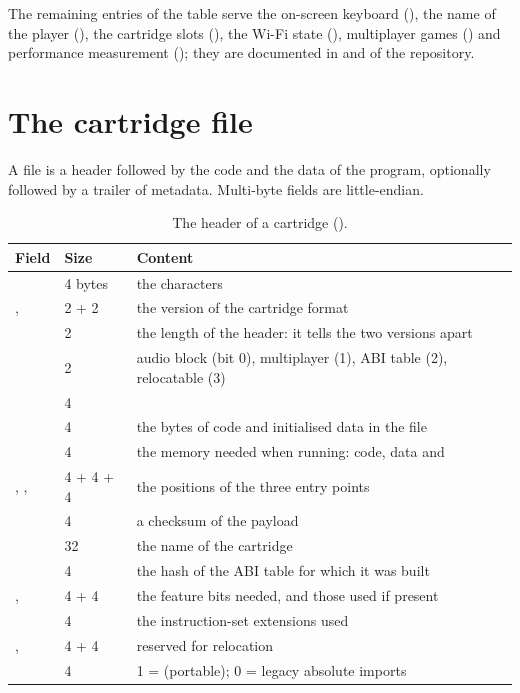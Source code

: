 The remaining entries of the table serve the on-screen keyboard
(), the name of the player
(), the cartridge slots
(), the Wi-Fi state (), multiplayer
games () and performance measurement
(); they are documented in  and
 of the repository.

\section{The cartridge file}

A  file is a header followed by the code and the data of the
program, optionally followed by a trailer of metadata. Multi-byte fields are
little-endian.

\begin{table}[htb]
\centering\small
\caption{The header of a cartridge ().}\label{tab:prg:header}
\begin{tabularx}{\textwidth}{@{}P{0.3\textwidth}lL@{}}
\toprule
\textbf{Field} & \textbf{Size} & \textbf{Content}\\
\midrule
{} & 4 bytes & the characters \\
,  & 2 + 2 & the version of the cartridge format\\
 & 2 & the length of the header: it tells the two versions apart\\
 & 2 & audio block (bit 0), multiplayer (1), ABI table (2), relocatable (3)\\
 & 4 & \\
 & 4 & the bytes of code and initialised data in the file\\
 & 4 & the memory needed when running: code, data and \\
, ,  & 4 + 4 + 4 & the positions of the three entry points\\
 & 4 & a checksum of the payload\\
 & 32 & the name of the cartridge\\
\midrule
{} & 4 & the hash of the ABI table for which it was built\\
,  & 4 + 4 & the feature bits needed, and those used if present\\
 & 4 & the instruction-set extensions used\\
,  & 4 + 4 & reserved for relocation\\
 & 4 & 1 =  (portable); 0 = legacy absolute imports\\
\bottomrule
\end{tabularx}
\end{table}

